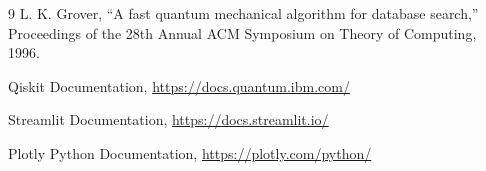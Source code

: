 \begin{thebibliography}{9}
    L. K. Grover, ``A fast quantum mechanical algorithm for database search,'' Proceedings of the 28th Annual ACM Symposium on Theory of Computing, 1996.

    Qiskit Documentation, \url{https://docs.quantum.ibm.com/}

    Streamlit Documentation, \url{https://docs.streamlit.io/}

    Plotly Python Documentation, \url{https://plotly.com/python/}
\end{thebibliography}
